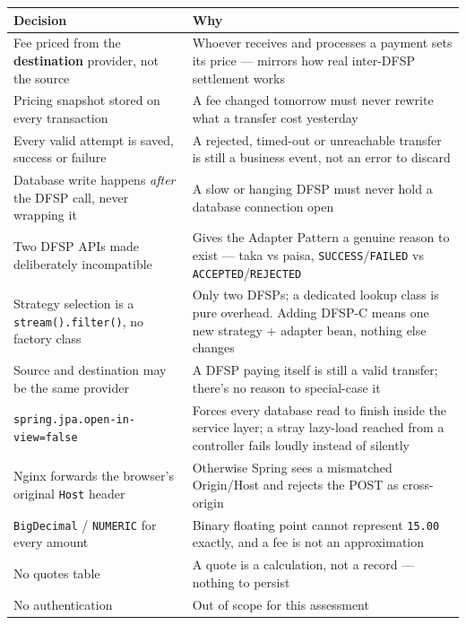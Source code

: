 \documentclass[12pt,a4paper]{article}
\begin{document}
\begin{longtable}{L{0.42\textwidth} L{0.50\textwidth}}
\toprule
\textbf{Decision} & \textbf{Why} \\
\midrule
\endhead
Fee priced from the \textbf{destination} provider, not the source &
Whoever receives and processes a payment sets its price --- mirrors how real
inter-DFSP settlement works \\
Pricing snapshot stored on every transaction &
A fee changed tomorrow must never rewrite what a transfer cost yesterday \\
Every valid attempt is saved, success or failure &
A rejected, timed-out or unreachable transfer is still a business event, not an
error to discard \\
Database write happens \emph{after} the DFSP call, never wrapping it &
A slow or hanging DFSP must never hold a database connection open \\
Two DFSP APIs made deliberately incompatible &
Gives the Adapter Pattern a genuine reason to exist --- taka vs paisa,
\texttt{SUCCESS}/\texttt{FAILED} vs \texttt{ACCEPTED}/\texttt{REJECTED} \\
Strategy selection is a \texttt{stream().filter()}, no factory class &
Only two DFSPs; a dedicated lookup class is pure overhead. Adding DFSP-C means
one new strategy + adapter bean, nothing else changes \\
Source and destination may be the same provider &
A DFSP paying itself is still a valid transfer; there's no reason to
special-case it \\
\texttt{spring.jpa.open-in-view=false} &
Forces every database read to finish inside the service layer; a stray
lazy-load reached from a controller fails loudly instead of silently \\
Nginx forwards the browser's original \texttt{Host} header &
Otherwise Spring sees a mismatched Origin/Host and rejects the POST as
cross-origin \\
\texttt{BigDecimal} / \texttt{NUMERIC} for every amount &
Binary floating point cannot represent \texttt{15.00} exactly, and a fee is
not an approximation \\
No quotes table &
A quote is a calculation, not a record --- nothing to persist \\
No authentication &
Out of scope for this assessment \\
\bottomrule
\end{longtable}

\clearpage
\end{document}
